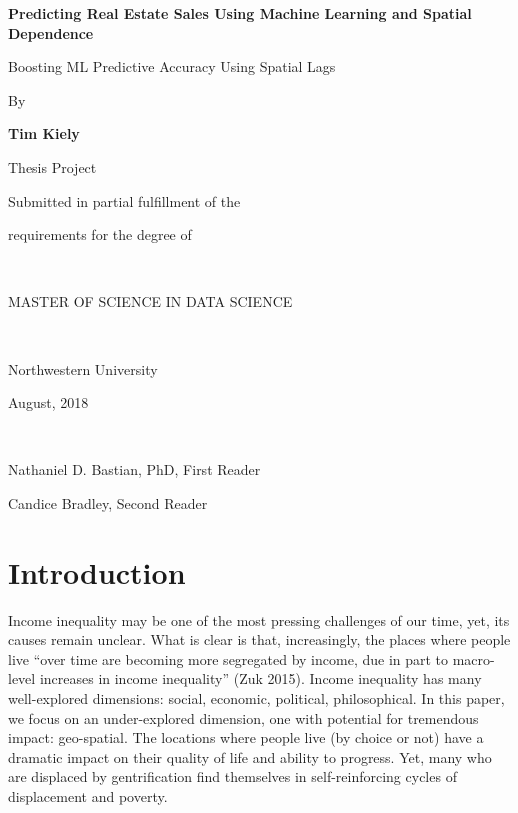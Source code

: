 \documentclass[12pt,]{article}
\title{}
\author{}
\date{}
\begin{document}

\titlepage
\center
\vspace{4 cm}
\LARGE

\bf 
Predicting Real Estate Sales Using Machine Learning and Spatial Dependence

\Large

Boosting ML Predictive Accuracy Using Spatial Lags

\rm
\normalsize

By

\textbf{Tim Kiely}

Thesis Project

Submitted in partial fulfillment of the

requirements for the degree of

~

MASTER OF SCIENCE IN DATA SCIENCE

~

Northwestern University

August, 2018

~

Nathaniel D. Bastian, PhD, First Reader

Candice Bradley, Second Reader

\newpage
\normalsize
\singlespace
\tableofcontents
\doublespace
\newpage
{}

\pagestyle{plain}
\justify

\hypertarget{introduction}{%
\section{Introduction}\label{introduction}}

Income inequality may be one of the most pressing challenges of our
time, yet, its causes remain unclear. What is clear is that,
increasingly, the places where people live ``over time are becoming more
segregated by income, due in part to macro-level increases in income
inequality'' (Zuk 2015). Income inequality has many well-explored
dimensions: social, economic, political, philosophical. In this paper,
we focus on an under-explored dimension, one with potential for
tremendous impact: geo-spatial. The locations where people live (by
choice or not) have a dramatic impact on their quality of life and
ability to progress. Yet, many who are displaced by gentrification find
themselves in self-reinforcing cycles of displacement and poverty.
\end{document}
